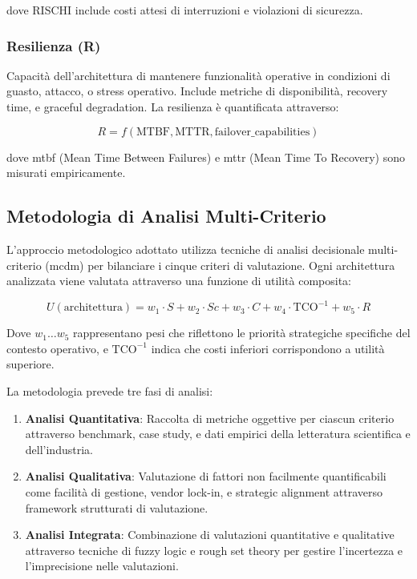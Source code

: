 dove RISCHI include costi attesi di interruzioni e violazioni di sicurezza.

\subsubsection{Resilienza (R)}

Capacità dell'architettura di mantenere funzionalità operative in condizioni di guasto, attacco, o stress operativo. Include metriche di disponibilità, recovery time, e graceful degradation. La resilienza è quantificata attraverso:

\begin{equation}
R = f(\text{MTBF}, \text{MTTR}, \text{failover\_capabilities})
\label{eq:resilienza}
\end{equation}

dove \gls{mtbf} (Mean Time Between Failures) e \gls{mttr} (Mean Time To Recovery) sono misurati empiricamente.

\subsection{Metodologia di Analisi Multi-Criterio}
\label{subsec:metodologia-mcdm}

L'approccio metodologico adottato utilizza tecniche di analisi decisionale multi-criterio (\gls{mcdm}) per bilanciare i cinque criteri di valutazione. Ogni architettura analizzata viene valutata attraverso una funzione di utilità composita:

\begin{equation}
U(\text{architettura}) = w_1 \cdot S + w_2 \cdot Sc + w_3 \cdot C + w_4 \cdot \text{TCO}^{-1} + w_5 \cdot R
\label{eq:utilita-composita}
\end{equation}

Dove $w_1 \ldots w_5$ rappresentano pesi che riflettono le priorità strategiche specifiche del contesto operativo, e $\text{TCO}^{-1}$ indica che costi inferiori corrispondono a utilità superiore.

La metodologia prevede tre fasi di analisi:

\begin{enumerate}
    \item \textbf{Analisi Quantitativa}: Raccolta di metriche oggettive per ciascun criterio attraverso benchmark, case study, e dati empirici della letteratura scientifica e dell'industria.
    
    \item \textbf{Analisi Qualitativa}: Valutazione di fattori non facilmente quantificabili come facilità di gestione, vendor lock-in, e strategic alignment attraverso framework strutturati di valutazione.
    
    \item \textbf{Analisi Integrata}: Combinazione di valutazioni quantitative e qualitative attraverso tecniche di fuzzy logic e rough set theory per gestire l'incertezza e l'imprecisione nelle valutazioni.
\end{enumerate}

